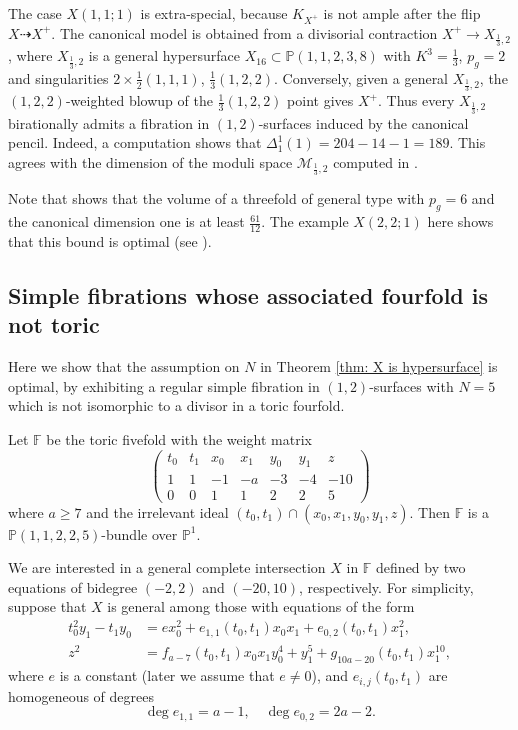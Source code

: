 \documentclass[a4paper,11pt]{amsart}
\newcommand{\M}{\ensuremath{\mathcal{M}}}
\newcommand{\FF}{\ensuremath{\mathbb{F}}}
\newcommand{\PP}{\ensuremath{\mathbb{P}}}
\theoremstyle{definition}
\theoremstyle{remark}
\numberwithin{equation}{section}
\begin{document}
The case $X(1,1;1)$ is extra-special, because $K_{X^+}$ is not ample after the flip $X\dashrightarrow X^+$. The canonical model is obtained from a divisorial contraction $X^+\to X_{\frac13,2}$, where $X_{\frac13,2}$ is a general hypersurface $X_{16}\subset\PP(1,1,2,3,8)$ with $K^3=\frac13$, $p_g=2$ and singularities $2\times\frac12(1,1,1)$, $\frac13(1,2,2)$. Conversely, given a general $X_{\frac13,2}$, the  $(1,2,2)$-weighted blowup of the $\frac13(1,2,2)$ point gives $X^+$. Thus every $X_{\frac13,2}$ birationally admits a fibration in $(1,2)$-surfaces induced by the canonical pencil. Indeed, a computation shows that $\Delta_1^1(1)=204-14-1=189$. This agrees with the dimension of the moduli space $\M_{\frac13,2}$ computed in \cite{CHJ}.

Note that \cite[Theorem 4.7]{CHJ} shows that the volume of a threefold of general type with $p_g = 6$ and the canonical dimension one is at least $\frac{61}{12}$. The example $X(2,2;1)$ here shows that this bound is optimal (see \cite[Remark 4.8]{CHJ}).

\subsection{Simple fibrations whose associated fourfold is not toric} \label{subsection: N=5}
Here we show that the assumption on $N$ in Theorem \ref{thm: X is hypersurface} is optimal, by exhibiting a regular simple fibration in $(1,2)$-surfaces with $N = 5$ which is not isomorphic to a divisor in a toric fourfold.

Let $\FF$ be the toric fivefold with the weight matrix
$$
\begin{pmatrix}
	t_0 & t_1 & x_0 & x_1 & y_0 & y_1 & z \\
	1 & 1 & -1 & -a & -3 & -4 & -10 \\
	0 & 0 & 1 & 1 & 2 & 2 & 5
\end{pmatrix}
$$
where $a\ge7$ and the irrelevant ideal $(t_0, t_1) \cap (x_0, x_1, y_0, y_1, z)$. Then $\mathbb{F}$ is a $\PP(1, 1, 2, 2, 5)$-bundle over $\PP^1$. 

We are interested in a general complete intersection $X$ in $\mathbb{F}$ defined by two equations of bidegree $(-2, 2)$ and $(-20, 10)$, respectively. For simplicity, suppose that $X$ is general among those with equations of the form
\begin{equation} \label{eq!non-toric-example}
	\begin{split}
		t_0^2y_1 - t_1y_0 & = ex_0^2+e_{1,1}(t_0,t_1)x_0x_1+e_{0,2}(t_0,t_1)x_1^2, \\
		z^2 & = f_{a-7}(t_0,t_1)x_0x_1y_0^4 + y_1^5 + g_{10a-20}(t_0,t_1)x_1^{10},
	\end{split}
\end{equation}
where $e$ is a constant (later we assume that $e \ne 0$), and $e_{i,j}(t_0,t_1)$ are homogeneous of degrees 
$$
\deg e_{1,1}=a-1, \quad \deg e_{0,2}=2a-2.
$$
\end{document}
